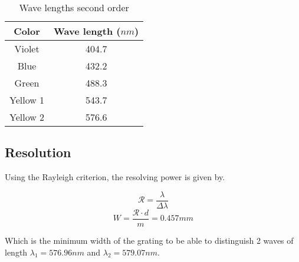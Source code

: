             \begin{table}[H]
                \centering
                \begin{tabular}{c|c}
                    \textbf{Color} & \textbf{Wave length ($nm$)} \\
                    \hline
                    Violet &  404.7\\
                    Blue &  432.2\\
                    Green & 488.3\\
                    Yellow 1 & 543.7\\
                    Yellow 2 & 576.6\\
                \end{tabular}
                \caption{Wave lengths second order}
            \end{table}
    \subsection{Resolution}
        Using the Rayleigh criterion, the resolving power is given by.
        
        \begin{equation}
            \mathcal{R} = \frac{\lambda}{\Delta \lambda}
        \end{equation}
        \begin{equation}
            W = \frac{\mathcal{R} \cdot d }{m} = 0.457mm
        \end{equation}
        
        Which is the minimum width of the grating to be able to distinguish 2 waves of length $\lambda_1 = 576.96nm$ and $\lambda_2 = 579.07nm$.
